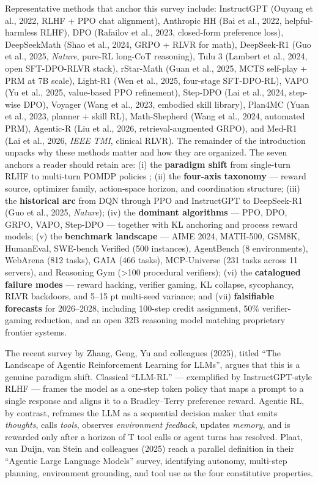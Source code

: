 \documentclass{article}
\begin{document}
Representative methods that anchor this survey include: InstructGPT (Ouyang et al., 2022, RLHF + PPO chat alignment), Anthropic HH (Bai et al., 2022, helpful-harmless RLHF), DPO (Rafailov et al., 2023, closed-form preference loss), DeepSeekMath (Shao et al., 2024, GRPO + RLVR for math), DeepSeek-R1 (Guo et al., 2025, \emph{Nature}, pure-RL long-CoT reasoning), Tulu 3 (Lambert et al., 2024, open SFT-DPO-RLVR stack), rStar-Math (Guan et al., 2025, MCTS self-play + PRM at 7B scale), Light-R1 (Wen et al., 2025, four-stage SFT-DPO-RL), VAPO (Yu et al., 2025, value-based PPO refinement), Step-DPO (Lai et al., 2024, step-wise DPO), Voyager (Wang et al., 2023, embodied skill library), Plan4MC (Yuan et al., 2023, planner + skill RL), Math-Shepherd (Wang et al., 2024, automated PRM), Agentic-R (Liu et al., 2026, retrieval-augmented GRPO), and Med-R1 (Lai et al., 2026, \emph{IEEE TMI}, clinical RLVR). The remainder of the introduction unpacks why these methods matter and how they are organized. The seven anchors a reader should retain are: (i) the \textbf{paradigm shift} from single-turn RLHF \citep{ouyang20222022} to multi-turn POMDP policies \citep{zhang20252025}; (ii) the \textbf{four-axis taxonomy} --- reward source, optimizer family, action-space horizon, and coordination structure; (iii) the \textbf{historical arc} from DQN \citep{mnih20132013} through PPO \citep{schulman2017proximalpolicyopti} and InstructGPT to DeepSeek-R1 (Guo et al., 2025, \emph{Nature}); (iv) the \textbf{dominant algorithms} --- PPO, DPO, GRPO, VAPO, Step-DPO --- together with KL anchoring and process reward models; (v) the \textbf{benchmark landscape} --- AIME 2024, MATH-500, GSM8K, HumanEval, SWE-bench Verified (500 instances), AgentBench (8 environments), WebArena (812 tasks), GAIA (466 tasks), MCP-Universe (231 tasks across 11 servers), and Reasoning Gym (\textgreater100 procedural verifiers); (vi) the \textbf{catalogued failure modes} --- reward hacking, verifier gaming, KL collapse, sycophancy, RLVR backdoors, and 5--15 pt multi-seed variance; and (vii) \textbf{falsifiable forecasts} for 2026--2028, including 100-step credit assignment, 50\% verifier-gaming reduction, and an open 32B reasoning model matching proprietary frontier systems.

The recent survey by Zhang, Geng, Yu and colleagues (2025), titled ``The Landscape of Agentic Reinforcement Learning for LLMs'', argues that this is a genuine paradigm shift. Classical ``LLM-RL'' --- exemplified by InstructGPT-style RLHF \citep{ouyang20222022} --- frames the model as a one-step token policy that maps a prompt to a single response and aligns it to a Bradley--Terry preference reward. Agentic RL, by contrast, reframes the LLM as a sequential decision maker that emits \emph{thoughts}, calls \emph{tools}, observes \emph{environment feedback}, updates \emph{memory}, and is rewarded only after a horizon of T tool calls or agent turns has resolved. Plaat, van Duijn, van Stein and colleagues (2025) reach a parallel definition in their ``Agentic Large Language Models'' survey, identifying autonomy, multi-step planning, environment grounding, and tool use as the four constitutive properties.
\end{document}
